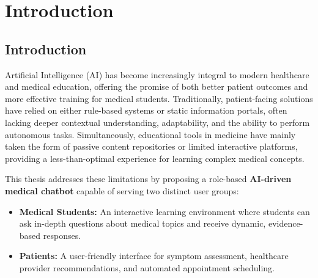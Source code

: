 \chapter{Introduction}

\label{Chapter1}
\section{Introduction}
Artificial Intelligence (AI) has become increasingly integral to modern healthcare and medical education, offering the promise of both better patient outcomes and more effective training for medical students. Traditionally, patient-facing solutions have relied on either rule-based systems or static information portals, often lacking deeper contextual understanding, adaptability, and the ability to perform autonomous tasks. Simultaneously, educational tools in medicine have mainly taken the form of passive content repositories or limited interactive platforms, providing a less-than-optimal experience for learning complex medical concepts.

\noindent This thesis addresses these limitations by proposing a role-based \textbf{AI-driven medical chatbot} capable of serving two distinct user groups:
\begin{itemize}
    \item \textbf{Medical Students:} An interactive learning environment where students can ask in-depth questions about medical topics and receive dynamic, evidence-based responses.
    \item \textbf{Patients:} A user-friendly interface for symptom assessment, healthcare provider recommendations, and automated appointment scheduling.
\end{itemize}

